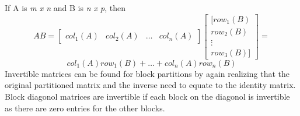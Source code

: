 \documentclass[12pt]{article}
\begin{document}
\newline
\newline
\newline
If A is \textit{m x n} and B is \textit{n x p}, then 
$$
AB=\begin{bmatrix}
    col_1(A) & col_2(A) & \dots & col_n(A)
\end{bmatrix} \begin{bmatrix}
    [row_1(B) \\ row_2(B) \\ \vdots \\ row_3(B)]     
\end{bmatrix}=
$$
\newline
$$
col_1(A)row_1(B) + \dots + col_n(A)row_n(B)
$$
\newline
Invertible matrices can be found for block partitions by again realizing that the original partitioned matrix and the inverse need to equate to the identity matrix. %
Block diagonol matrices are invertible if each block on the diagonol is invertible as there are zero entries for the other blocks. 
\end{document}
